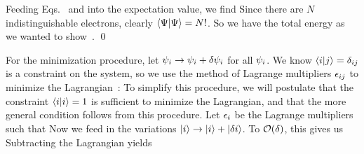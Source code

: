 {	Feeding Eqs.~ and  into the expectation value, we find
	Since there are $N$ indistinguishable electrons, clearly $\braket{\Psi} = N!$.  So we have the total energy
	as we wanted to show~\cite{Kim}. \qed
	
	For the minimization procedure, let $\psi_i \to \psi_i + \delta\psi_i$ for all $\psi_i$.  We know $\braket{i}{j} = \delta_{i j}$ is a constraint on the system, so we use the method of Lagrange multipliers $\epsilon_{i j}$ to minimize the Lagrangian~\cite{Lagrange}:
	To simplify this procedure, we will postulate that the constraint $\braket{i} = 1$ is sufficient to minimize the Lagrangian, and that the more general condition follows from this procedure.  Let $\epsilon_i$ be the Lagrange multipliers such that
	Now we feed in the variations $\ket{i} \to \ket{i} + \ket{\delta i}$.  To $\order{\del}$, this gives us
	Subtracting the Lagrangian yields
	}
